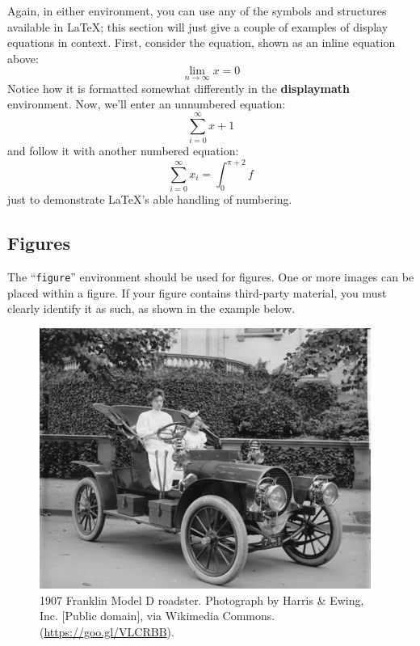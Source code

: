 \documentclass[sigconf]{acmart}
\begin{document}
Again, in either environment, you can use any of the symbols and
structures available in \LaTeX\@; this section will just give a couple
of examples of display equations in context.  First, consider the
equation, shown as an inline equation above:
\begin{equation}
  \lim_{n\rightarrow \infty}x=0
\end{equation}
Notice how it is formatted somewhat differently in
the \textbf{displaymath}
environment.  Now, we'll enter an unnumbered equation:
\begin{displaymath}
  \sum_{i=0}^{\infty} x + 1
\end{displaymath}
and follow it with another numbered equation:
\begin{equation}
  \sum_{i=0}^{\infty}x_i=\int_{0}^{\pi+2} f
\end{equation}
just to demonstrate \LaTeX's able handling of numbering.

\subsection*{Figures}

The ``\verb|figure|'' environment should be used for figures. One or
more images can be placed within a figure. If your figure contains
third-party material, you must clearly identify it as such, as shown
in the example below.
\begin{figure}[h]
  \centering
  \includegraphics[width=\linewidth]{sample-franklin}
  \caption{1907 Franklin Model D roadster. Photograph by Harris \&
    Ewing, Inc. [Public domain], via Wikimedia
    Commons. (\url{https://goo.gl/VLCRBB}).}
\end{figure}
\end{document}
